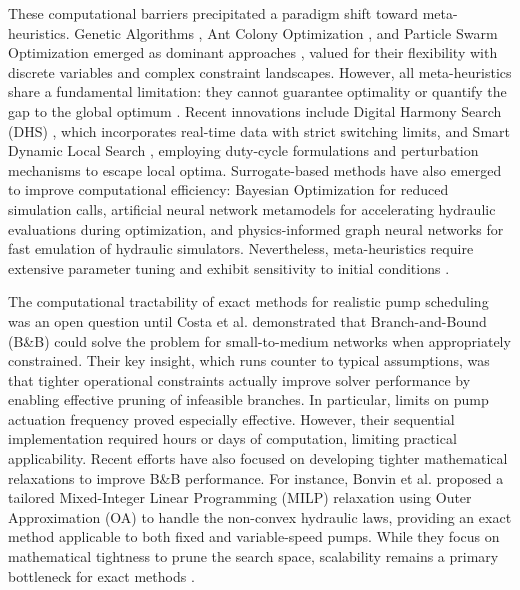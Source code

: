 \documentclass[final,3p,twocolumn]{elsarticle}
\begin{document}
These computational barriers precipitated a paradigm shift toward meta-heuristics. Genetic Algorithms \cite{Savic1997,Mackle1995}, Ant Colony Optimization \cite{LpezIbez2008}, and Particle Swarm Optimization \cite{AlAni2012} emerged as dominant approaches \cite{Reis2023}, valued for their flexibility with discrete variables and complex constraint landscapes. However, all meta-heuristics share a fundamental limitation: they cannot guarantee optimality or quantify the gap to the global optimum \cite{Costa2016,Reis2023}. Recent innovations include Digital Harmony Search (DHS) \cite{Paola2024}, which incorporates real-time data with strict switching limits, and Smart Dynamic Local Search \cite{Bras2025}, employing duty-cycle formulations and perturbation mechanisms to escape local optima. Surrogate-based methods have also emerged to improve computational efficiency: Bayesian Optimization \cite{Candelieri2018,Bagloee2018} for reduced simulation calls, artificial neural network metamodels \cite{Broad2010,Rao2007} for accelerating hydraulic evaluations during optimization, and physics-informed graph neural networks \cite{Ashraf2024} for fast emulation of hydraulic simulators. Nevertheless, meta-heuristics require extensive parameter tuning and exhibit sensitivity to initial conditions \cite{Reis2023}.

The computational tractability of exact methods for realistic pump scheduling was an open question until Costa et al. \cite{Costa2016} demonstrated that Branch-and-Bound (B\&B) \cite{Land1960} could solve the problem for small-to-medium networks when appropriately constrained. Their key insight, which runs counter to typical assumptions, was that tighter operational constraints actually improve solver performance by enabling effective pruning of infeasible branches. In particular, limits on pump actuation frequency proved especially effective. However, their sequential implementation required hours or days of computation, limiting practical applicability. Recent efforts have also focused on developing tighter mathematical relaxations to improve B\&B performance. For instance, Bonvin et al. \cite{Bonvin2021} proposed a tailored Mixed-Integer Linear Programming (MILP) relaxation using Outer Approximation (OA) to handle the non-convex hydraulic laws, providing an exact method applicable to both fixed and variable-speed pumps. While they focus on mathematical tightness to prune the search space, scalability remains a primary bottleneck for exact methods \cite{Reis2023,MalaJetmarova2018}.
\end{document}
